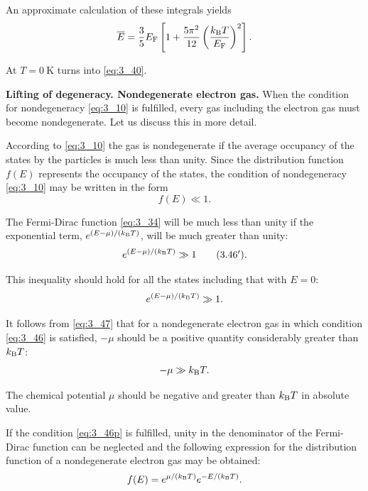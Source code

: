 \noindent
An approximate calculation of these integrals yields
\begin{equation}\label{eq:3_45}
    \overline{E} = \frac{3}{5} E_{\text{F}} \left[1 + \frac{5\pi^2}{12} \left(\frac{k_{\text{B}}T}{E_{\text{F}}}\right)^2\right].
\end{equation}

\noindent
At $T=\SI{0}{\kelvin}$ turns into \eqref{eq:3_40}.

\textbf{Lifting of degeneracy. Nondegenerate electron gas.} When the
condition for nondegeneracy \eqref{eq:3_10} is fulfilled, every gas including the electron gas must become nondegenerate. Let us discuss this in more detail.

According to \eqref{eq:3_10} the gas is nondegenerate if the average occupancy of the states by the particles is much less than unity. Since the distribution function $f(E)$ represents the occupancy of the states, the condition of nondegeneracy \eqref{eq:3_10} may be written in the form
\begin{equation}\label{eq:3_46}
    f(E)\ll 1.
\end{equation}

The Fermi-Dirac function \eqref{eq:3_34} will be much less than unity if the exponential term, $e^{(E-\mu)/(k_{\text{B}}T)}$, will be much greater than unity:
\begin{equation}\label{eq:3_46p}
    e^{(E-\mu)/(k_{\text{B}}T)}\gg 1 \tag{3.46$'$}.
\end{equation}

\noindent
This inequality should hold for all the states including that with $E=0$:
\begin{equation}\label{eq:3_47}
    e^{(E-\mu)/(k_{\text{B}}T)}\gg 1.
\end{equation}

\noindent
It follows from \eqref{eq:3_47} that for a nondegenerate electron gas in which condition \eqref{eq:3_46} is satisfied, $-\mu$ should be a positive quantity considerably greater than $k_{\text{B}}T$:
\begin{equation}\label{eq:3_48}
    -\mu \gg k_{\text{B}}T.
\end{equation}

\noindent
The chemical potential $\mu$ should be negative and greater than $k_{\text{B}}T$ in absolute value.

If the condition \eqref{eq:3_46p} is fulfilled, unity in the denominator of the Fermi-Dirac function can be neglected and the following expression for the distribution function of a nondegenerate electron gas may be obtained:
\begin{equation}\label{eq:3_49}
    f(E) = e^{\mu/(k_{\text{B}}T)} e^{-E/(k_{\text{B}}T)}.
\end{equation}

